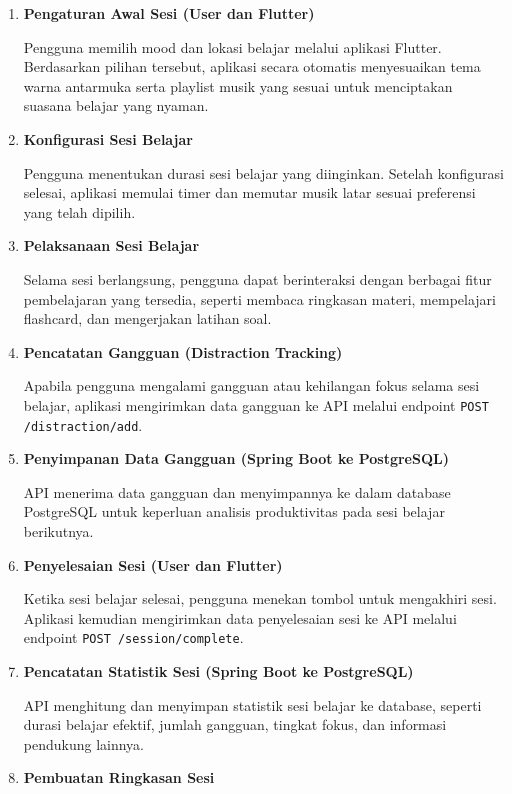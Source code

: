 \documentclass[11pt]{article}
\begin{document}
\begin{enumerate}

\item \textbf{Pengaturan Awal Sesi (User dan Flutter)}

Pengguna memilih mood dan lokasi belajar melalui aplikasi Flutter. Berdasarkan pilihan tersebut, aplikasi secara otomatis menyesuaikan tema warna antarmuka serta playlist musik yang sesuai untuk menciptakan suasana belajar yang nyaman.

\item \textbf{Konfigurasi Sesi Belajar}

Pengguna menentukan durasi sesi belajar yang diinginkan. Setelah konfigurasi selesai, aplikasi memulai timer dan memutar musik latar sesuai preferensi yang telah dipilih.

\item \textbf{Pelaksanaan Sesi Belajar}

Selama sesi berlangsung, pengguna dapat berinteraksi dengan berbagai fitur pembelajaran yang tersedia, seperti membaca ringkasan materi, mempelajari flashcard, dan mengerjakan latihan soal.

\item \textbf{Pencatatan Gangguan (Distraction Tracking)}

Apabila pengguna mengalami gangguan atau kehilangan fokus selama sesi belajar, aplikasi mengirimkan data gangguan ke API melalui endpoint \texttt{POST /distraction/add}.

\item \textbf{Penyimpanan Data Gangguan (Spring Boot ke PostgreSQL)}

API menerima data gangguan dan menyimpannya ke dalam database PostgreSQL untuk keperluan analisis produktivitas pada sesi belajar berikutnya.

\item \textbf{Penyelesaian Sesi (User dan Flutter)}

Ketika sesi belajar selesai, pengguna menekan tombol untuk mengakhiri sesi. Aplikasi kemudian mengirimkan data penyelesaian sesi ke API melalui endpoint \texttt{POST /session/complete}.

\item \textbf{Pencatatan Statistik Sesi (Spring Boot ke PostgreSQL)}

API menghitung dan menyimpan statistik sesi belajar ke database, seperti durasi belajar efektif, jumlah gangguan, tingkat fokus, dan informasi pendukung lainnya.

\item \textbf{Pembuatan Ringkasan Sesi}


\end{enumerate}
\end{document}
